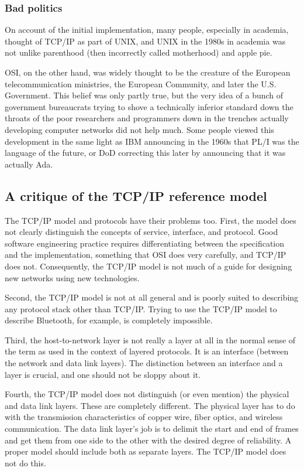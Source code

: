 \documentclass[b5paper,11pt]{memoir}
\begin{document}
\subsubsection{Bad politics}

On account of the initial implementation, many people, especially in
academia, thought of TCP/IP as part of UNIX, and UNIX in the 1980s in
academia was not unlike parenthood (then incorrectly called motherhood)
and apple pie.

OSI, on the other hand, was widely thought to be the creature of the
European telecommunication ministries, the European Community, and later
the U.S. Government. This belief was only partly true, but the very idea
of a bunch of government bureaucrats trying to shove a technically
inferior standard down the throats of the poor researchers and
programmers down in the trenches actually developing computer networks
did not help much. Some people viewed this development in the same light
as IBM announcing in the 1960s that PL/I was the language of the future,
or DoD correcting this later by announcing that it was actually Ada.



\subsection{A critique of the TCP/IP reference model}

The TCP/IP model and protocols have their problems too.
First, the model does not clearly distinguish the concepts of service, interface, and
protocol. Good software engineering practice requires differentiating
between the specification and the implementation, something that OSI
does very carefully, and TCP/IP does not. Consequently, the TCP/IP model
is not much of a guide for designing new networks using new
technologies.

Second, the TCP/IP model is not at all general and is poorly suited to
describing any protocol stack other than TCP/IP. Trying to use the
TCP/IP model to describe Bluetooth, for example, is completely
impossible.

Third, the host-to-network layer is not really a layer at all in the
normal sense of the term as used in the context of layered protocols. It
is an interface (between the network and data link layers). The
distinction between an interface and a layer is crucial, and one should
not be sloppy about it.

Fourth, the TCP/IP model does not distinguish (or even mention) the
physical and data link layers. These are completely different. The
physical layer has to do with the transmission characteristics of copper
wire, fiber optics, and wireless communication. The data link layer's
job is to delimit the start and end of frames and get them from one side
to the other with the desired degree of reliability. A proper model
should include both as separate layers. The TCP/IP model does not do
this.
\end{document}
